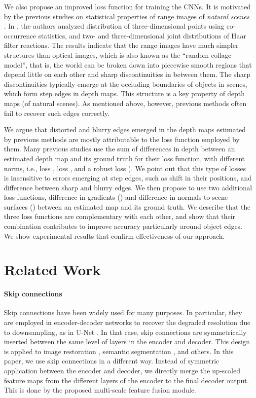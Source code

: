 \documentclass[10pt,twocolumn,letterpaper]{article}
\begin{document}
We also propose an improved loss function for training the CNNs.
It is motivated by the previous studies on statistical properties of range images of {\em natural scenes} \cite{huang2000statistics,LeeIJCV03,kalkan}. In \cite{huang2000statistics}, the authors analyzed distribution of three-dimensional points using co-occurrence statistics, and two- and three-dimensional joint distributions of Haar filter reactions. The results indicate that the range images have much simpler structures than optical images, which is also known as the ``random collage model'', that is, the world can be broken down into piecewise smooth regions that depend little on each other and sharp discontinuities in between them.
The sharp discontinuities typically emerge at the occluding boundaries of objects in scenes, which form step edges in depth maps. This structure is a key property of depth maps (of natural scenes).
As mentioned above, however, previous methods often fail to recover such edges correctly.


We argue that distorted and blurry edges emerged in the depth maps estimated by previous methods are mostly attributable to the loss function employed by them. Many previous studies use the sum of differences in depth between an estimated depth map and
its ground truth for their loss function, with different norms, i.e.,  loss
\cite{Eigen2014depth,Li2015DepthAS,liu2016learning},  loss \cite{ma2017sparse,Park2017JointEO}, and a
robust  loss \cite{laina2016deeper}).
We point out that this type of losses is insensitive to errors emerging at step edges, such as shift in their positions, and difference between sharp and blurry edges. 
We then propose to use two additional loss
functions, difference in gradients 
()
and difference in normals to scene surfaces
()
between an estimated map and its ground truth. 
We describe that the three loss functions are complementary with each other, and show that their combination contributes to improve
accuracy particularly around object edges. We show experimental results that confirm effectiveness of our approach. 


\section{Related Work}

\paragraph{Skip connections} 
Skip connections have been widely used for many purposes. In particular, they are employed in encoder-decoder networks to recover the degraded resolution due to downsampling, as in U-Net \cite{drozdzal2016importance}.
In that case, skip connections are symmetrically inserted between the same level of layers in the encoder and decoder.
This design is applied to image restoration \cite{Mao2016ImageRU} , semantic segmentation \cite{jiang2018rednet}, and others. 
In this paper, we use skip connections in a different way. Instead of symmetric application between the encoder and decoder, we directly merge the up-scaled feature maps from the different layers of the encoder to the final decoder output. This is done by the proposed multi-scale feature fusion module.
\end{document}
